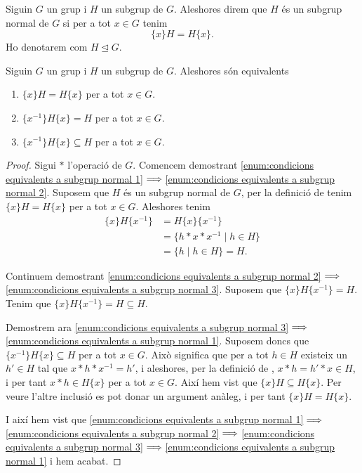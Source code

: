 \documentclass[../../Main.tex]{subfiles}
\begin{document}
	\begin{definition}
		\label{def:subgrup normal}
		Siguin \(G\) un grup i \(H\) un subgrup de \(G\). Aleshores direm que \(H\) és un subgrup normal de \(G\) si per a tot \(x\in G\) tenim
		\[\{x\}H=H\{x\}.\]
		Ho denotarem com \(H\trianglelefteq G\).
	\end{definition}
	\begin{proposition}
		\label{prop:condicions equivalents a subgrup normal}
		Siguin \(G\) un grup i \(H\) un subgrup de \(G\). Aleshores són equivalents
		\begin{enumerate}
			\item\label{enum:condicions equivalents a subgrup normal 1} \(\{x\}H=H\{x\}\) per a tot \(x\in G\).
			\item\label{enum:condicions equivalents a subgrup normal 2} \(\{x^{-1}\}H\{x\}=H\) per a tot \(x\in G\).
			\item\label{enum:condicions equivalents a subgrup normal 3} \(\{x^{-1}\}H\{x\}\subseteq H\) per a tot \(x\in G\).
		\end{enumerate}
		\begin{proof}
			Sigui \(\ast\) l'operació de \(G\). Comencem demostrant \eqref{enum:condicions equivalents a subgrup normal 1}\(\implies\)\eqref{enum:condicions equivalents a subgrup normal 2}. Suposem que \(H\) és un subgrup normal de \(G\), per la definició de  tenim \(\{x\}H=H\{x\}\) per a tot \(x\in G\). Aleshores tenim
			\begin{align*}
			\{x\}H\{x^{-1}\}&=H\{x\}\{x^{-1}\}\\
			&=\{h\ast x\ast x^{-1}\mid h\in H\}\\
			&=\{h\mid h\in H\}=H.
			\end{align*}
			
			Continuem demostrant \eqref{enum:condicions equivalents a subgrup normal 2}\(\implies\)\eqref{enum:condicions equivalents a subgrup normal 3}. Suposem que \(\{x\}H\{x^{-1}\}=H\). Tenim que \(\{x\}H\{x^{-1}\}=H\subseteq H\).
			
			Demostrem ara \eqref{enum:condicions equivalents a subgrup normal 3}\(\implies\)\eqref{enum:condicions equivalents a subgrup normal 1}. Suposem doncs que \(\{x^{-1}\}H\{x\}\subseteq H\) per a tot \(x\in G\). Això significa que per a tot \(h\in H\) existeix un \(h'\in H\) tal que \(x\ast h\ast x^{-1}=h'\), i aleshores, per la definició de , \(x\ast h=h'\ast x\in H\), i per tant \(x\ast h\in H\{x\}\) per a tot \(x\in G\). Així hem vist que \(\{x\}H\subseteq H\{x\}\). Per veure l'altre inclusió es pot donar un argument anàleg, i per tant \(\{x\}H= H\{x\}\). %
			
			I així hem vist que \eqref{enum:condicions equivalents a subgrup normal 1}\(\implies\)\eqref{enum:condicions equivalents a subgrup normal 2}\(\implies\)\eqref{enum:condicions equivalents a subgrup normal 3}\(\implies\)\eqref{enum:condicions equivalents a subgrup normal 1} i hem acabat.
		\end{proof}
	\end{proposition}
\end{document}
